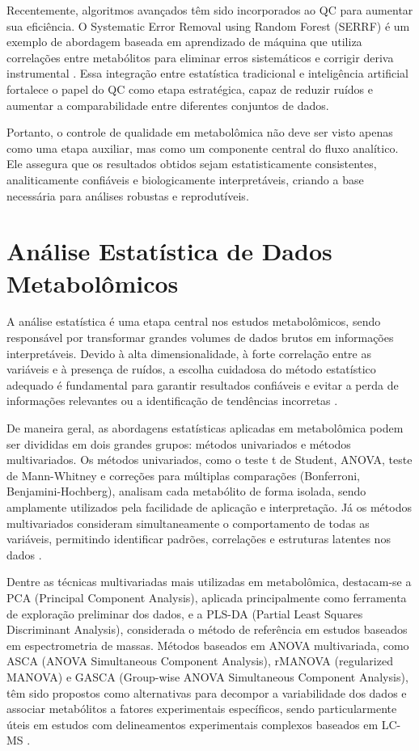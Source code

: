 Recentemente, algoritmos avançados têm sido incorporados ao QC para aumentar sua eficiência. O Systematic Error Removal using Random Forest (SERRF) é um exemplo de abordagem baseada em aprendizado de máquina que utiliza correlações entre metabólitos para eliminar erros sistemáticos e corrigir deriva instrumental \cite{fan2019systematic}. Essa integração entre estatística tradicional e inteligência artificial fortalece o papel do QC como etapa estratégica, capaz de reduzir ruídos e aumentar a comparabilidade entre diferentes conjuntos de dados.

Portanto, o controle de qualidade em metabolômica não deve ser visto apenas como uma etapa auxiliar, mas como um componente central do fluxo analítico. Ele assegura que os resultados obtidos sejam estatisticamente consistentes, analiticamente confiáveis e biologicamente interpretáveis, criando a base necessária para análises robustas e reprodutíveis.


\section{\textbf{Análise Estatística de Dados Metabolômicos}}

A análise estatística é uma etapa central nos estudos metabolômicos, sendo responsável por transformar grandes volumes de dados brutos em informações interpretáveis. Devido à alta dimensionalidade, à forte correlação entre as variáveis e à presença de ruídos, a escolha cuidadosa do método estatístico adequado é fundamental para garantir resultados confiáveis e evitar a perda de informações relevantes ou a identificação de tendências incorretas \cite{anwardeen2023statistical}.

De maneira geral, as abordagens estatísticas aplicadas em metabolômica podem ser divididas em dois grandes grupos: métodos univariados e métodos multivariados. Os métodos univariados, como o teste t de Student, ANOVA, teste de Mann-Whitney e correções para múltiplas comparações (Bonferroni, Benjamini-Hochberg), analisam cada metabólito de forma isolada, sendo amplamente utilizados pela facilidade de aplicação e interpretação. Já os métodos multivariados consideram simultaneamente o comportamento de todas as variáveis, permitindo identificar padrões, correlações e estruturas latentes nos dados \cite{anwardeen2023statistical,antonelli2019statistical}.

Dentre as técnicas multivariadas mais utilizadas em metabolômica, destacam-se a PCA (Principal Component Analysis), aplicada principalmente como ferramenta de exploração preliminar dos dados, e a PLS-DA (Partial Least Squares Discriminant Analysis), considerada o método de referência em estudos baseados em espectrometria de massas. Métodos baseados em ANOVA multivariada, como ASCA (ANOVA Simultaneous Component Analysis), rMANOVA (regularized MANOVA) e GASCA (Group-wise ANOVA Simultaneous Component Analysis), têm sido propostos como alternativas para decompor a variabilidade dos dados e associar metabólitos a fatores experimentais específicos, sendo particularmente úteis em estudos com delineamentos experimentais complexos baseados em LC-MS \cite{perezcova2022comparison}.

